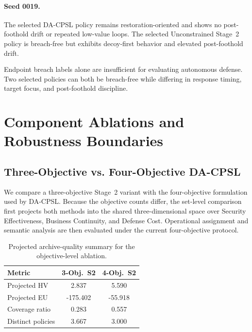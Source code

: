 \documentclass[sigconf,review,anonymous]{acmart}
\begin{document}
\paragraph{Seed 0019.}
The selected DA-CPSL policy remains restoration-oriented and shows no
post-foothold drift or repeated low-value loops. The selected
Unconstrained Stage~2 policy is breach-free but exhibits decoy-first
behavior and elevated post-foothold drift.

Endpoint breach labels alone are insufficient for evaluating autonomous
defense. Two selected policies can both be breach-free while differing in
response timing, target focus, and post-foothold discipline.

\section{Component Ablations and Robustness Boundaries}
\label{app:ablation-robustness}

\subsection{Three-Objective vs. Four-Objective DA-CPSL}
\label{app:objective-ablation}

We compare a three-objective Stage~2 variant with the four-objective
formulation used by DA-CPSL. Because the objective counts differ, the
set-level comparison first projects both methods into the shared
three-dimensional space over Security Effectiveness, Business Continuity,
and Defense Cost. Operational assignment and semantic analysis are then
evaluated under the current four-objective protocol.

\begin{table}[!htbp]
\centering
\caption{Projected archive-quality summary for the objective-level ablation.}
\label{tab:app-rq4-objective-projected-set}
\begingroup
\small
\setlength{\tabcolsep}{4pt}
\renewcommand{\arraystretch}{1.10}
\begin{tabular*}{\columnwidth}{@{\extracolsep{\fill}}lcc@{}}
\toprule
Metric & 3-Obj.~S2 & 4-Obj.~S2 \\
\midrule
Projected HV & 2.837 & 5.590 \\
Projected EU & -175.402 & -55.918 \\
Coverage ratio & 0.283 & 0.557 \\
Distinct policies & 3.667 & 3.000 \\
\bottomrule
\end{tabular*}
\endgroup
\end{table}
\end{document}
